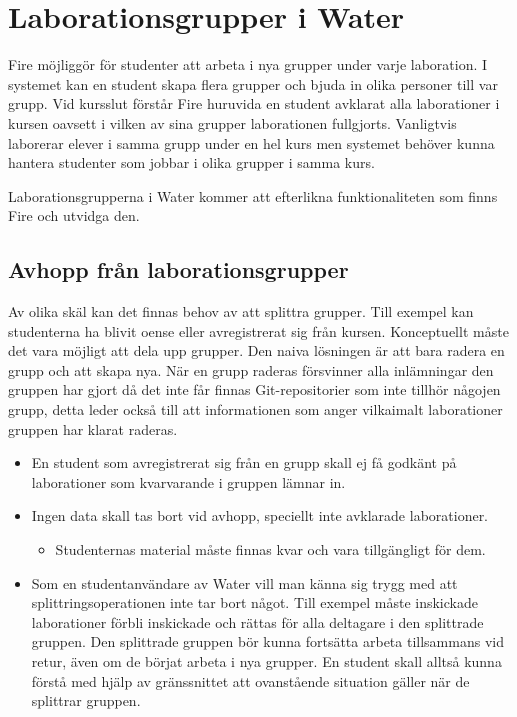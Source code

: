 \section{Laborationsgrupper i Water}

Fire möjliggör för studenter att arbeta i nya grupper under varje laboration. I systemet kan en student skapa flera grupper och bjuda in olika personer till var grupp. Vid kursslut förstår Fire huruvida en student avklarat alla laborationer i kursen oavsett i vilken av sina grupper laborationen fullgjorts. Vanligtvis laborerar elever i samma grupp under en  hel kurs men systemet behöver kunna hantera studenter som jobbar i olika grupper i samma kurs.

Laborationsgrupperna i Water kommer att efterlikna funktionaliteten som finns Fire och utvidga den.

\subsection{Avhopp från laborationsgrupper}
Av olika skäl kan det finnas behov av att splittra grupper.  Till exempel kan studenterna ha blivit oense eller avregistrerat sig från kursen. Konceptuellt måste det vara möjligt att dela upp grupper. Den naiva lösningen är att bara radera en grupp och att skapa nya. När en grupp raderas försvinner alla inlämningar den gruppen har gjort då det inte får finnas Git-repositorier som inte tillhör någojen grupp, detta leder också till att informationen som anger vilkaimalt laborationer gruppen har klarat raderas.

\begin{itemize}
  \item En student som avregistrerat sig från en grupp skall ej få godkänt på laborationer som kvarvarande i gruppen lämnar in.
  \item Ingen data skall tas bort vid avhopp, speciellt inte avklarade laborationer.
  \begin{itemize}
    \item Studenternas material måste finnas kvar och vara tillgängligt för dem.
  \end{itemize}
  \item Som en studentanvändare av Water vill man känna sig trygg med att splittringsoperationen inte tar bort något. Till exempel måste inskickade laborationer förbli inskickade och rättas för alla deltagare i den splittrade gruppen. Den splittrade gruppen bör kunna fortsätta arbeta tillsammans vid retur, även om de börjat arbeta i nya grupper. En student skall alltså kunna förstå med hjälp av gränssnittet att ovanstående situation gäller när de splittrar gruppen.
\end{itemize}

